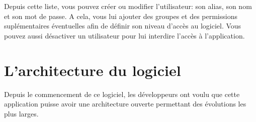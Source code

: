 \documentclass[letterpaper,10pt,french]{sphinxmanual}
\begin{document}
\noindent{}

Depuis cette liste, vous pouvez créer ou modifier l’utilisateur: son
alias, son nom et son mot de passe. A cela, vous lui ajouter des groupes et
des permissions suplémentaires éventuelles afin de définir son niveau
d’accès au logiciel. Vous pouvez aussi désactiver un utilisateur pour lui
interdire l’accès à l’application.

\noindent{}

\noindent{}


\section{L’architecture du logiciel}
\label{\detokenize{CORE/architecture:l-architecture-du-logiciel}}\label{\detokenize{CORE/architecture::doc}}
Depuis le commencement de ce logiciel, les développeurs ont voulu que cette application puisse avoir une architecture ouverte permettant des évolutions les plus larges.



\renewcommand{\indexname}{Index}
\printindex
\end{document}
